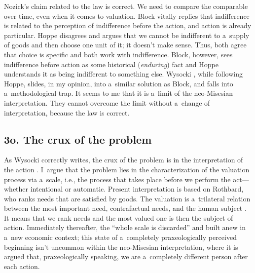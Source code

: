 Nozick's claim related to the law is correct. We need to compare the comparable over time, even when it comes to valuation. Block 
\parencites*[][]{}[][]{} %
 vitally replies that indifference is related to the perception of indifference before the action, and action is already particular. Hoppe 
\parencite*[][]{} %
 disagrees and argues that we cannot be indifferent to a~supply of goods and then choose one unit of it; it doesn't make sense. Thus, both agree that choice is specific and both work with indifference. Block, however, sees indifference before action as some historical (\textit{enduring}) fact and Hoppe understands it as being indifferent to something else. Wysocki 
\parencite*[][]{}, %
 while following Hoppe, slides, in my opinion, into a~similar solution as Block, and falls into a~methodological trap. It seems to me that it is a~limit of the neo-Misesian interpretation. They cannot overcome the limit without a~change of interpretation, because the law is correct.



\subsection*{3o. The crux of the problem}



As Wysocki 
\parencite[][footnote 30]{} %
 correctly writes, the crux of the problem is in the interpretation of the action 
\parencite[see also][]{}. %
 I~argue that the problem lies in the characterization of the valuation process via a~scale, i.e., the process that takes place before we perform the act---whether intentional or automatic. Present interpretation is based on Rothbard, 
\parencite[][pp.5–6]{} %
 who ranks needs that are satisfied by goods. The valuation is a~trilateral relation between the most important need, contrafactual needs, and the human subject 
\parencite[][]{}. %
 It means that we rank needs and the most valued one is then the subject of action. Immediately thereafter, the ``whole scale is discarded'' and built anew in a~new economic context; this state of a~completely praxeologically perceived beginning isn't uncommon within the neo-Misesian interpretation, where it is argued that, praxeologically speaking, we are a~completely different person after each action.



